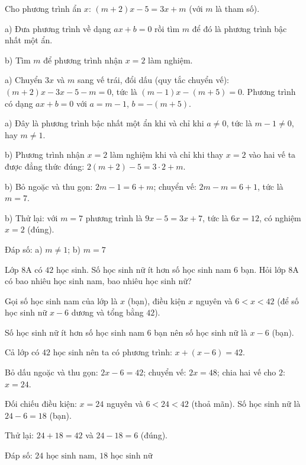 \begin{problem}[8DS-PT1-035]
Cho phương trình ẩn $x$: $(m + 2)x - 5 = 3x + m$ (với $m$ là tham số).

a) Đưa phương trình về dạng $ax + b = 0$ rồi tìm $m$ để đó là phương trình bậc nhất một ẩn.

b) Tìm $m$ để phương trình nhận $x = 2$ làm nghiệm.

\begin{solution}
a) Chuyển $3x$ và $m$ sang vế trái, đổi dấu (quy tắc chuyển vế): $(m + 2)x - 3x - 5 - m = 0$, tức là $(m - 1)x - (m + 5) = 0$. Phương trình có dạng $ax + b = 0$ với $a = m - 1$, $b = -(m + 5)$.

a) Đây là phương trình bậc nhất một ẩn khi và chỉ khi $a \neq 0$, tức là $m - 1 \neq 0$, hay $m \neq 1$.

b) Phương trình nhận $x = 2$ làm nghiệm khi và chỉ khi thay $x = 2$ vào hai vế ta được đẳng thức đúng: $2(m + 2) - 5 = 3 \cdot 2 + m$.

b) Bỏ ngoặc và thu gọn: $2m - 1 = 6 + m$; chuyển vế: $2m - m = 6 + 1$, tức là $m = 7$.

b) Thử lại: với $m = 7$ phương trình là $9x - 5 = 3x + 7$, tức là $6x = 12$, có nghiệm $x = 2$ (đúng).

Đáp số: a) $\boxed{m \neq 1}$; b) $\boxed{m = 7}$
\end{solution}
\end{problem}

\begin{problem}[8DS-PT1-036]
Lớp 8A có $42$ học sinh. Số học sinh nữ ít hơn số học sinh nam $6$ bạn. Hỏi lớp 8A có bao nhiêu học sinh nam, bao nhiêu học sinh nữ?

\begin{solution}
Gọi số học sinh nam của lớp là $x$ (bạn), điều kiện $x$ nguyên và $6 < x < 42$ (để số học sinh nữ $x - 6$ dương và tổng bằng $42$).

Số học sinh nữ ít hơn số học sinh nam $6$ bạn nên số học sinh nữ là $x - 6$ (bạn).

Cả lớp có $42$ học sinh nên ta có phương trình: $x + (x - 6) = 42$.

Bỏ dấu ngoặc và thu gọn: $2x - 6 = 42$; chuyển vế: $2x = 48$; chia hai vế cho $2$: $x = 24$.

Đối chiếu điều kiện: $x = 24$ nguyên và $6 < 24 < 42$ (thoả mãn). Số học sinh nữ là $24 - 6 = 18$ (bạn).

Thử lại: $24 + 18 = 42$ và $24 - 18 = 6$ (đúng).

Đáp số: $\boxed{24 \text{ học sinh nam, } 18 \text{ học sinh nữ}}$
\end{solution}
\end{problem}

